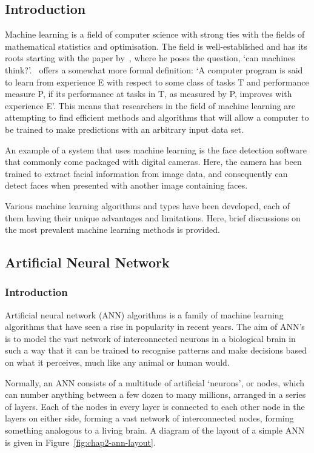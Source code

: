 \subsection{Introduction}

Machine learning is a field of computer science with strong ties with the fields of mathematical statistics and optimisation. The field is well-established and has its roots starting with the paper by~\cite{turing1950computing}, where he poses the question, `can machines think?'.~\cite{michalski2013machine} offers a somewhat more formal definition: `A computer program is said to learn from experience E with respect to some class of tasks T and performance measure P, if its performance at tasks in T, as measured by P, improves with experience E'. This means that researchers in the field of machine learning are attempting to find efficient methods and algorithms that will allow a computer to be trained to make predictions with an arbitrary input data set. 

An example of a system that uses machine learning is the face detection software that commonly come packaged with digital cameras. Here, the camera has been trained to extract facial information from image data, and consequently can detect faces when presented with another image containing faces.

Various machine learning algorithms and types have been developed, each of them having their unique advantages and limitations. Here, brief discussions on the most prevalent machine learning methods is provided. 

\subsection{Artificial Neural Network}

\subsubsection{Introduction}

Artificial neural network (ANN) algorithms is a family of machine learning algorithms that have seen a rise in popularity in recent years. The aim of ANN's is to model the vast network of interconnected neurons in a biological brain in such a way that it can be trained to recognise patterns and make decisions based on what it perceives, much like any animal or human would. 

Normally, an ANN consists of a multitude of artificial `neurons', or nodes, which can number anything between a few dozen to many millions, arranged in a series of layers. Each of the nodes in every layer is connected to each other node in the layers on either side, forming a vast network of interconnected nodes, forming something analogous to a living brain. A diagram of the layout of a simple ANN is given in Figure~\ref{fig:chap2-ann-layout}.


